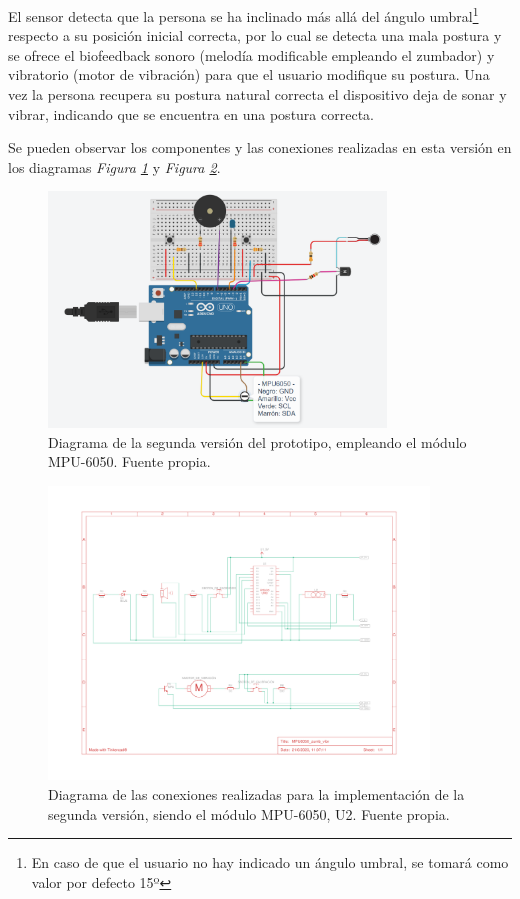 El sensor detecta que la persona se ha inclinado más allá del ángulo umbral\footnote{En caso de que el usuario no hay indicado un ángulo umbral, se tomará como valor por defecto 15º} respecto a su posición inicial correcta, por lo cual se detecta una mala postura y se ofrece el biofeedback sonoro (melodía modificable empleando el zumbador) y vibratorio (motor de vibración) para que el usuario modifique su postura. Una vez la persona recupera su postura natural correcta el dispositivo deja de sonar y vibrar, indicando que se encuentra en una postura correcta. 

Se pueden observar los componentes y las conexiones realizadas en esta versión en los diagramas \textit{Figura \ref{fig:ProtV2}} y \textit{Figura \ref{fig:ProtV2_esquema}}.

\begin{figure}[h!]
    \centering
    \includegraphics[width=0.8\textwidth]{img/PrototipoV2_MPU6050.png}
    \caption{Diagrama de la segunda versión del prototipo, empleando el módulo MPU-6050. Fuente propia.}
    \label{fig:ProtV2} 
\end{figure}

\begin{figure}[h]
    \centering
    \includegraphics[width=0.9\textwidth]{img/Prot_V2_Esquema.pdf}
    \caption{Diagrama de las conexiones realizadas para la implementación de la segunda versión, siendo el módulo MPU-6050, U2. Fuente propia.}
    \label{fig:ProtV2_esquema} 
\end{figure}


